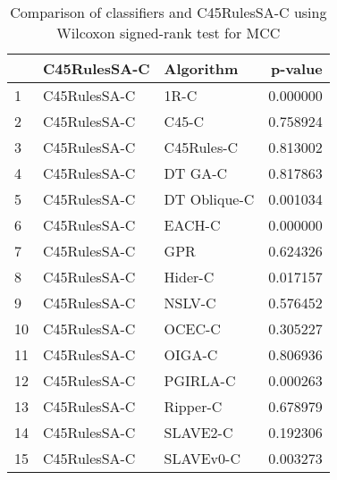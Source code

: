 \begin{table}
\footnotesize
\caption{Comparison of classifiers and C45RulesSA-C using Wilcoxon signed-rank test for MCC}
\label{tab:C45RulesSA-C wilcoxon MCC comparison}
\begin{tabular}{lllr}
\hline
 & C45RulesSA-C & Algorithm & p-value \\
\hline
1 & C45RulesSA-C & 1R-C & 0.000000 \\
2 & C45RulesSA-C & C45-C & 0.758924 \\
3 & C45RulesSA-C & C45Rules-C & 0.813002 \\
4 & C45RulesSA-C & DT GA-C & 0.817863 \\
5 & C45RulesSA-C & DT Oblique-C & 0.001034 \\
6 & C45RulesSA-C & EACH-C & 0.000000 \\
7 & C45RulesSA-C & GPR & 0.624326 \\
8 & C45RulesSA-C & Hider-C & 0.017157 \\
9 & C45RulesSA-C & NSLV-C & 0.576452 \\
10 & C45RulesSA-C & OCEC-C & 0.305227 \\
11 & C45RulesSA-C & OIGA-C & 0.806936 \\
12 & C45RulesSA-C & PGIRLA-C & 0.000263 \\
13 & C45RulesSA-C & Ripper-C & 0.678979 \\
14 & C45RulesSA-C & SLAVE2-C & 0.192306 \\
15 & C45RulesSA-C & SLAVEv0-C & 0.003273 \\
\hline
\end{tabular}
\end{table}

